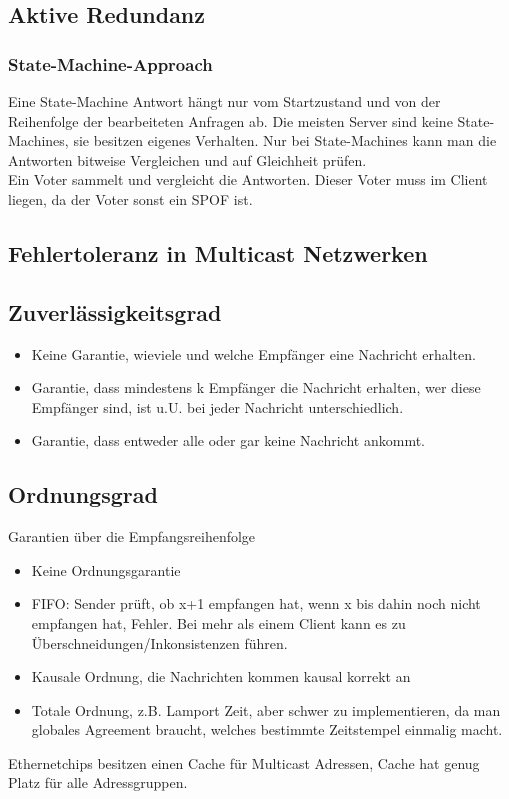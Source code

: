 \documentclass[a4paper]{article}
\begin{document}
\subsection{Aktive Redundanz}
\subsubsection{State-Machine-Approach}
Eine State-Machine Antwort hängt nur vom Startzustand und von der Reihenfolge der bearbeiteten Anfragen ab. Die meisten Server sind keine State-Machines, sie besitzen eigenes Verhalten. Nur bei State-Machines kann man die Antworten bitweise Vergleichen und auf Gleichheit prüfen.\\
Ein Voter sammelt und vergleicht die Antworten. Dieser Voter muss im Client liegen, da der Voter sonst ein SPOF ist.
\subsection{Fehlertoleranz in Multicast Netzwerken}
\subsection{Zuverlässigkeitsgrad}
\begin{itemize}
\item Keine Garantie, wieviele und welche Empfänger eine Nachricht erhalten.
\item Garantie, dass mindestens k Empfänger die Nachricht erhalten, wer diese Empfänger sind, ist u.U. bei jeder Nachricht unterschiedlich.
\item Garantie, dass entweder alle oder gar keine Nachricht ankommt.
\end{itemize}
\subsection{Ordnungsgrad}
Garantien über die Empfangsreihenfolge
\begin{itemize}
\item Keine Ordnungsgarantie
\item FIFO: Sender prüft, ob x+1 empfangen hat, wenn x bis dahin noch nicht empfangen hat, Fehler. Bei mehr als einem Client kann es zu Überschneidungen/Inkonsistenzen führen.
\item Kausale Ordnung, die Nachrichten kommen kausal korrekt an
\item Totale Ordnung, z.B. Lamport Zeit, aber schwer zu implementieren, da man globales Agreement braucht, welches bestimmte Zeitstempel einmalig macht.
\end{itemize}
Ethernetchips besitzen einen Cache für Multicast Adressen, Cache hat genug Platz für alle Adressgruppen.
\end{document}

